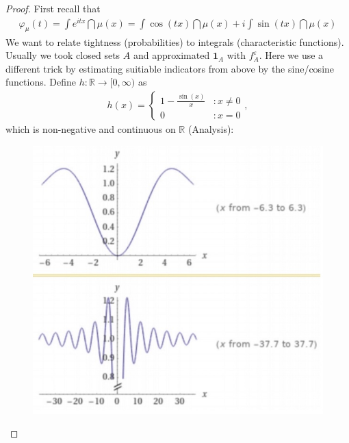 \begin{proof}[Proof]
				
First recall that						\begin{align*}
	\varphi_{\mu}(t) = \int e^{itx} \dint \mu(x) = \int \cos(tx) \dint \mu(x) + i \int \sin (tx) \dint \mu(x)
\end{align*}
We want to relate tightness (probabilities) to integrals (characteristic functions). Usually we took closed sets $A$ and approximated $\mathbf 1_A$ with $f_A^\varepsilon$. Here we use a different trick by estimating suitiable indicators from above by the sine/cosine functions. Define $h \colon \mathbb{R} \to [0, \infty)$ as 
							\begin{align*}
								h(x) = \begin{cases}
									1 - \frac{\sin(x)}{x} &: x \neq 0 \\
									0 &: x = 0 \end{cases},
							\end{align*}				
						which is non-negative and continuous on $\mathbb{R}$ (Analysis):
							\begin{figure}[h]
							\begin{center}
								\includegraphics[scale=0.3]{bild.jpg}
							\end{center}
							\end{figure}
						

\end{proof}
